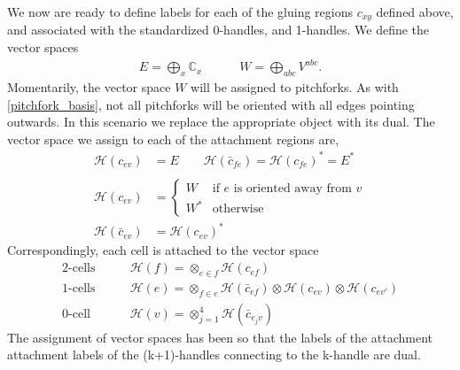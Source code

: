 \documentclass[12pt,a4paper]{article}
\newcommand{\tp}{\otimes}
\newcommand{\cc}{\mathbb{C}}
\newcommand{\mch}{\mathcal{H}}
\begin{document}
We now are ready to define labels for each of the gluing regions $c_{xy}$ defined above, 
and associated with the standardized 0-handles, and 1-handles. 
We define the vector spaces 
\begin{align}
E = \bigoplus_{x} \cc_x \quad \quad \quad W = \bigoplus_{abc}V^{abc}.
\end{align}
Momentarily, the vector space $W$ will be assigned to pitchforks.
As with \eqref{pitchfork_basis}, not all pitchforks will be oriented with all edges pointing outwards. 
In this scenario we replace the appropriate object with its dual.
The vector space we assign to each of the attachment regions are,
\begin{align}
  \mch(c_{ev}) &= E \quad \quad \mch(\bar{c}_{fe}) = \mch(c_{fe})^* = E^*\\
  \\
\mch(c_{ev} )&= \begin{cases} W &\text{if $e$ is oriented away from $v$} \\
W^* &\text{otherwise} 
\end{cases}\\
\mch(\bar{c}_{ev}) &= \mch(c_{ev})^*
\end{align}
Correspondingly, each cell is attached to the vector space 
\begin{align}
\label{tensor_space}
\text{2-cells} \quad \quad  & \mch(f) = \tp_{e \in f} \mch(c_{ef})  \\
\text{1-cells}\quad \quad   & \mch(e) = \tp_{f \in e}\mch (\bar{c}_{ef}) \tp \mch(c_{ev}) \tp \mch (c_{ev'}) \\
 \text{0-cell} \quad \quad  & \mch(v) = \tp_{j =1}^4\mch(\bar{c}_{e_jv}) 
\end{align}
The assignment of vector spaces has been so that the labels of the attachment attachment labels of the (k+1)-handles connecting to the k-handle are dual.
\end{document}
